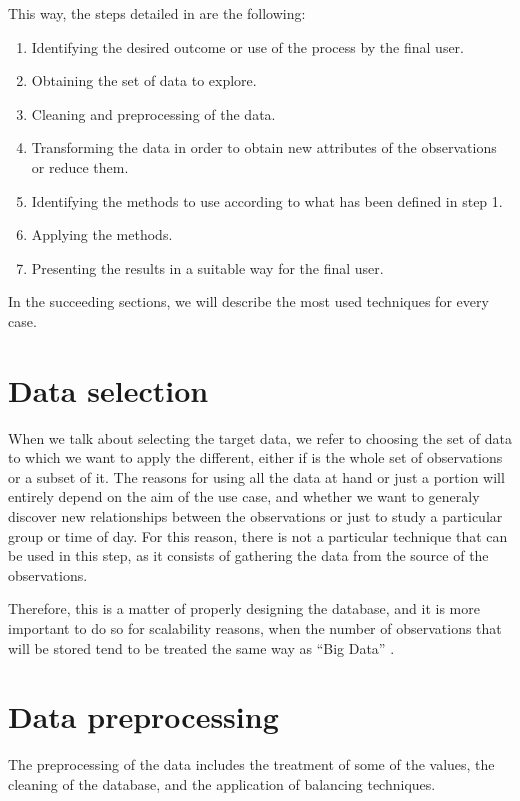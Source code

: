This way, the steps detailed in \cite{fayyad1996data} are the following:

\begin{enumerate}
	\item Identifying the desired outcome or use of the process by the final user.
	\item Obtaining the set of data to explore.
	\item Cleaning and preprocessing of the data.
	\item Transforming the data in order to obtain new attributes of the observations or reduce them.
	\item Identifying the methods to use according to what has been defined in step 1.
	\item Applying the methods.
	\item Presenting the results in a suitable way for the final user.
\end{enumerate}

In the succeeding sections, we will describe the most used techniques for every case.

\section{Data selection}

When we talk about selecting the target data, we refer to choosing the set of data to which we want to apply the different, either if is the whole set of observations or a subset of it. The reasons for using all the data at hand or just a portion will entirely depend on the aim of the use case, and whether we want to generaly discover new relationships between the observations or just to study a particular group or time of day. For this reason, there is not a particular technique that can be used in this step, as it consists of gathering the data from the source of the observations.

Therefore, this is a matter of properly designing the database, and it is more important to do so for scalability reasons, when the number of observations that will be stored tend to be treated the same way as ``Big Data'' \cite{begoli2012design, wu2014data}.

\section{Data preprocessing}

The preprocessing of the data includes the treatment of some of the values, the cleaning of the database, and the application of balancing techniques.

